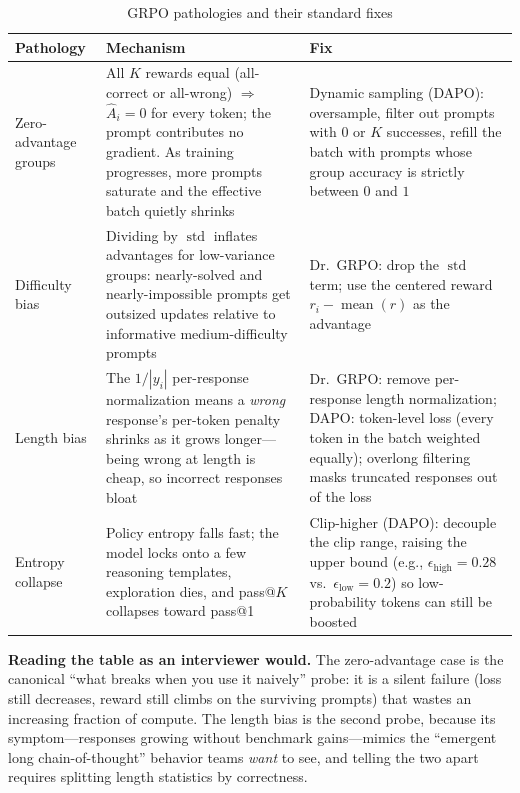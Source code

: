 \begin{table}[H]
\centering
\caption{GRPO pathologies and their standard fixes}
\label{tab:grpo_pathologies}
\begin{tabularx}{\textwidth}{lXX}
\toprule
\textbf{Pathology} & \textbf{Mechanism} & \textbf{Fix} \\
\midrule
Zero-advantage groups & All $K$ rewards equal (all-correct or all-wrong) $\Rightarrow$ $\hat{A}_i = 0$ for every token; the prompt contributes no gradient. As training progresses, more prompts saturate and the effective batch quietly shrinks & Dynamic sampling (DAPO): oversample, filter out prompts with $0$ or $K$ successes, refill the batch with prompts whose group accuracy is strictly between $0$ and $1$ \\
Difficulty bias & Dividing by $\operatorname{std}$ inflates advantages for low-variance groups: nearly-solved and nearly-impossible prompts get outsized updates relative to informative medium-difficulty prompts & Dr.~GRPO: drop the $\operatorname{std}$ term; use the centered reward $r_i - \operatorname{mean}(r)$ as the advantage \\
Length bias & The $1/|y_i|$ per-response normalization means a \textit{wrong} response's per-token penalty shrinks as it grows longer---being wrong at length is cheap, so incorrect responses bloat & Dr.~GRPO: remove per-response length normalization; DAPO: token-level loss (every token in the batch weighted equally); overlong filtering masks truncated responses out of the loss \\
Entropy collapse & Policy entropy falls fast; the model locks onto a few reasoning templates, exploration dies, and pass@$K$ collapses toward pass@1 & Clip-higher (DAPO): decouple the clip range, raising the upper bound (e.g., $\epsilon_{\text{high}} = 0.28$ vs.\ $\epsilon_{\text{low}} = 0.2$) so low-probability tokens can still be boosted \\
\bottomrule
\end{tabularx}
\end{table}

\textbf{Reading the table as an interviewer would.} The zero-advantage case is the canonical ``what breaks when you use it naively'' probe: it is a silent failure (loss still decreases, reward still climbs on the surviving prompts) that wastes an increasing fraction of compute. The length bias is the second probe, because its symptom---responses growing without benchmark gains---mimics the ``emergent long chain-of-thought'' behavior teams \textit{want} to see, and telling the two apart requires splitting length statistics by correctness.

